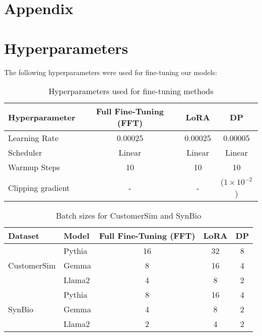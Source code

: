\section*{Appendix}


\section{Hyperparameters}
\label{appendix:hp-models}

The following hyperparameters were used for fine-tuning our models:
\begin{table}[H]
\centering
\scriptsize
\caption{Hyperparameters used for fine-tuning methods}
\begin{tabular}{l|c|c|c}
\textbf{Hyperparameter} & \textbf{Full Fine-Tuning (FFT)} & \textbf{LoRA} & \textbf{DP} \\
\toprule
Learning Rate           & 0.00025                         & 0.00025       & 0.00005         \\
Scheduler               & Linear                          & Linear        & Linear          \\
Warmup Steps            & 10                              & 10            & 10              \\
Clipping gradient          & -                               & -             &  (\(1 \times 10^{-2}\)) \\
\bottomrule
\end{tabular}
\end{table}

\begin{table}[H]
\centering
\scriptsize
\caption{Batch sizes for CustomerSim and SynBio}
\begin{tabular}{l|l|c|c|c}
\textbf{Dataset} & \textbf{Model} & \textbf{Full Fine-Tuning (FFT)} & \textbf{LoRA} & \textbf{DP} \\
\toprule
\multirow{3}{*}{CustomerSim} & Pythia & 16 & 32 & 8 \\
                             & Gemma  & 8  & 16 & 4 \\
                             & Llama2 & 4  & 8  & 2 \\
\midrule
\multirow{3}{*}{SynBio}         & Pythia & 8  & 16 & 4 \\
                             & Gemma  & 4  & 8  & 2 \\
                             & Llama2 & 2  & 4  & 2 \\
\bottomrule
\end{tabular}
\end{table}


